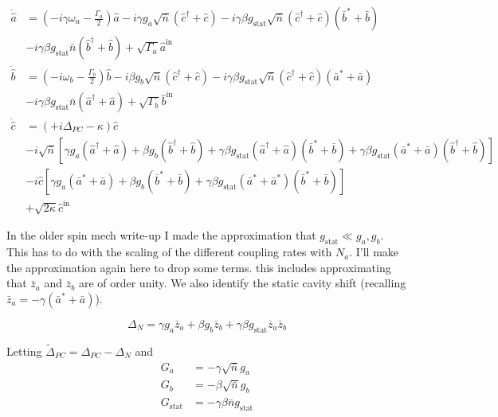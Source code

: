 \documentclass[12pt]{article}
\begin{document}
\begin{align}
\dot{\hat{a}} &= \left(-i \gamma \omega_a-\frac{\Gamma_a}{2}\right)\hat{a} - i \gamma  g_a \sqrt{\bar{n}}(\hat{c}^{\dag}+\hat{c}) - i \gamma \beta g_{\text{stat}} \sqrt{\bar{n}}(\hat{c}^{\dag}+\hat{c})(\bar{b}^*+\bar{b})\\
&- i \gamma \beta g_{\text{stat}} \bar{n}(\hat{b}^{\dag}+\hat{b}) + \sqrt{\Gamma_a}\hat{a}^{\text{in}}\\
\dot{\hat{b}} &= \left(-i \omega_b - \frac{\Gamma_b}{2}\right)\hat{b} -i \beta g_b \sqrt{\bar{n}}(\hat{c}^{\dag}+\hat{c}) - i \gamma \beta g_{\text{stat}} \sqrt{\bar{n}}(\hat{c}^{\dag}+\hat{c})(\bar{a}^{*}+\bar{a}) \\
&- i \gamma \beta g_{\text{stat}} \bar{n}(\hat{a}^{\dag}+\hat{a}) + \sqrt{\Gamma_b}\hat{b}^{\text{in}}\\
\dot{\hat{c}} &= \left(+i \Delta_{PC} -\kappa\right)\hat{c}\\
&-i\sqrt{\bar{n}}\left[\gamma g_a (\hat{a}^{\dag}+\hat{a})+ \beta g_b (\hat{b}^{\dag} + \hat{b})+\gamma \beta g_{\text{stat}}(\hat{a}^{\dag}+\hat{a})(\bar{b}^{*}+\bar{b})+ \gamma \beta g_{\text{stat}}(\bar{a}^{*}+\bar{a})(\hat{b}^{\dag}+\hat{b})\right]\\
&-i\hat{c}\left[\gamma g_a (\bar{a}^{*}+\bar{a})+ \beta g_b (\bar{b}^{*} + \bar{b})+ \gamma \beta g_{\text{stat}}(\bar{a}^{*}+\bar{a}^*)(\bar{b}^{*}+\bar{b})\right]\\
&+ \sqrt{2\kappa}\hat{c}^{\text{in}}
\end{align}

In the older spin mech write-up I made the approximation that $g_{\text{stat}}\ll g_a,g_b$. This has to do with the scaling of the different coupling rates with $N_a$. I'll make the approximation again here to drop some terms. this includes approximating that $\bar{z}_a$ and $\bar{z}_b$ are of order unity. We also identify the static cavity shift (recalling $\bar{z}_a = -\gamma (\bar{a}^* + \bar{a})$).

\[
\Delta_N = \gamma g_a \bar{z}_a + \beta g_b \bar{z}_b + \gamma \beta g_{\text{stat}}\bar{z}_a \bar{z}_b
\]

Letting $\tilde{\Delta}_{PC} = \Delta_{PC} - \Delta_N$ and 
\begin{align}
G_a &= -\gamma \sqrt{\bar{n}} g_a\\
G_b &= -\beta \sqrt{\bar{n}} g_b\\
G_{\text{stat}} &= -\gamma \beta \bar{n}g_{\text{stat}}
\end{align}
\end{document}

